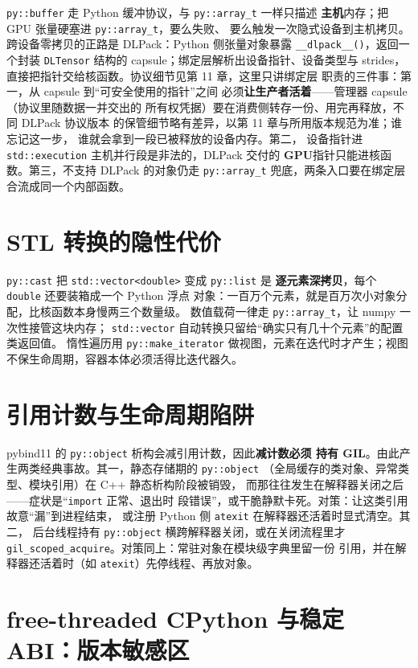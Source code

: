 \documentclass[12pt,a4paper,fontset=fandol]{ctexbook}
\newcommand{\Tp}[1]{\texttt{#1}}
\newcommand{\Dom}[1]{\textsf{\bfseries #1}}
\newcommand{\GPU}{\Dom{GPU}}
\begin{document}
\Tp{py::buffer} 走 Python 缓冲协议，与 \Tp{py::array\_t} 一样只描述
\textbf{主机}内存；把 GPU 张量硬塞进 \Tp{py::array\_t}，要么失败、
要么触发一次隐式设备到主机拷贝。跨设备零拷贝的正路是 DLPack：Python
侧张量对象暴露 \Tp{\_\_dlpack\_\_()}，返回一个封装
\Tp{DLTensor} 结构的 capsule；绑定层解析出设备指针、设备类型与
strides，直接把指针交给核函数。协议细节见第 11 章，这里只讲绑定层
职责的三件事：第一，从 capsule 到``可安全使用的指针''之间
必须\textbf{让生产者活着}——管理器 capsule（协议里随数据一并交出的
所有权凭据）要在消费侧转存一份、用完再释放，不同 DLPack 协议版本
的保管细节略有差异，以第 11 章与所用版本规范为准；谁忘记这一步，
谁就会拿到一段已被释放的设备内存。第二，
设备指针进 \Tp{std::execution} 主机并行段是非法的，DLPack 交付的
\GPU{}指针只能进核函数。第三，不支持 DLPack 的对象仍走
\Tp{py::array\_t} 兜底，两条入口要在绑定层合流成同一个内部函数。

\section{STL 转换的隐性代价}

\Tp{py::cast} 把 \Tp{std::vector<double>} 变成 \Tp{py::list} 是
\textbf{逐元素深拷贝}，每个 \Tp{double} 还要装箱成一个 Python 浮点
对象：一百万个元素，就是百万次小对象分配，比核函数本身慢两三个数量级。
数值载荷一律走 \Tp{py::array\_t}，让 numpy 一次性接管这块内存；
\Tp{std::vector} 自动转换只留给``确实只有几十个元素''的配置类返回值。
惰性遍历用 \Tp{py::make\_iterator} 做视图，元素在迭代时才产生；视图
不保生命周期，容器本体必须活得比迭代器久。

\section{引用计数与生命周期陷阱}

pybind11 的 \Tp{py::object} 析构会减引用计数，因此\textbf{减计数必须
持有 GIL}。由此产生两类经典事故。其一，静态存储期的 \Tp{py::object}
（全局缓存的类对象、异常类型、模块引用）在 C++ 静态析构阶段被销毁，
而那往往发生在解释器关闭之后——症状是``\Tp{import} 正常、退出时
段错误''，或干脆静默卡死。对策：让这类引用故意``漏''到进程结束，
或注册 Python 侧 \Tp{atexit} 在解释器还活着时显式清空。其二，
后台线程持有 \Tp{py::object} 横跨解释器关闭，或在关闭流程里才
\Tp{gil\_scoped\_acquire}。对策同上：常驻对象在模块级字典里留一份
引用，并在解释器还活着时（如 \Tp{atexit}）先停线程、再放对象。

\section{free-threaded CPython 与稳定 ABI：版本敏感区}
\end{document}
